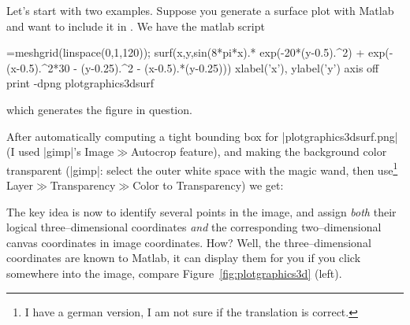 {{Let's start with two examples. Suppose you generate a surface plot with Matlab and want to include it in \PGFPlots. We have the matlab script
\begin{codeexample}=meshgrid(linspace(0,1,120));
surf(x,y,sin(8*pi*x).* exp(-20*(y-0.5).^2) + exp(-(x-0.5).^2*30 - (y-0.25).^2 - (x-0.5).*(y-0.25)))
xlabel('x'), ylabel('y')
axis off
print -dpng plotgraphics3dsurf
\end{codeexample}
\noindent which generates the figure in question. 

After automatically computing a tight bounding box for |plotgraphics3dsurf.png| (I used |gimp|'s Image$\gg$Autocrop feature), and making the background color transparent (|gimp|: select the outer white space with the magic wand, then use\footnote{I have a german version, I am not sure if the translation is correct.} Layer$\gg$Transparency$\gg$Color to Transparency) we get:

{\setlength{\fboxsep}{0pt}%
\centering
{}%

}%

The key idea is now to identify several points in the image, and assign \emph{both} their logical three--dimensional coordinates \emph{and} the corresponding two--dimensional canvas coordinates in image coordinates. How? Well, the three--dimensional coordinates are known to Matlab, it can display them for you if you click somewhere into the image, compare Figure~\ref{fig:plotgraphics3d} (left).

}}
